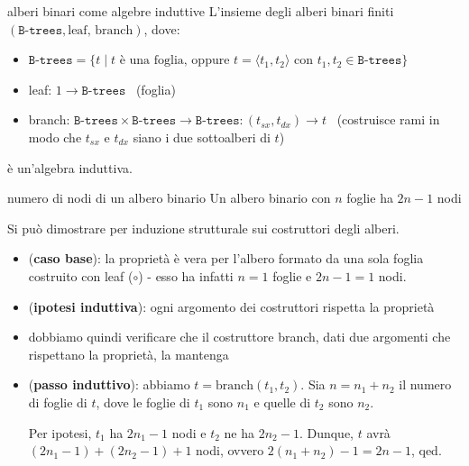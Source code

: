 \documentclass[a4paper,11pt]{report}
\begin{document}
\begin{gframe}{alberi binari come algebre induttive}
    L'insieme degli alberi binari finiti \( (\texttt{B-trees}, \text{leaf, branch}) \), dove:
    \begin{itemize}
        \item \( \texttt{B-trees}=\{t \mid t \text{ è una foglia, oppure } t=\langle t_1, t_2 \rangle \text{ con } t_1, t_2 \in \texttt{B-trees}\} \)
        \item leaf: \( 1\to \texttt{B-trees} \) \ {\color{gray}(foglia)}
        \item branch: \( \texttt{B-trees} \times  \texttt{B-trees} \to  \texttt{B-trees} : (t_{sx}, t_{dx})\to t\) \ {\color{gray}(costruisce rami in modo che \( t_{sx} \) e \( t_{dx} \) siano i due sottoalberi di \( t \))}
    \end{itemize}
    è un'algebra induttiva.
    \begin{thmframe}{numero di nodi di un albero binario}{}
        Un albero binario con \( n \) foglie ha \( 2n-1 \) nodi
        \begin{proofframe}
            Si può dimostrare per induzione strutturale sui costruttori degli alberi.
            \begin{itemize}
                \item (\textbf{caso base}): la proprietà è vera per l'albero formato da una sola foglia costruito con leaf (\( \circ \)) - esso ha infatti \( n = 1 \) foglie e \( 2n-1 = 1 \) nodi.
                \item (\textbf{ipotesi induttiva}): ogni argomento dei costruttori rispetta la proprietà
                \item dobbiamo quindi verificare che il costruttore branch, dati due argomenti che rispettano la proprietà, la mantenga
                \item (\textbf{passo induttivo}): abbiamo \( t = \text{branch}(t_1, t_2)\). 
                    \subitem Sia \(n = n_1 + n_2 \) il numero di foglie di \( t \), dove le foglie di \( t_1 \) sono \( n_1 \) e quelle di \( t_2 \) sono \( n_2 \). 

                    Per ipotesi, \( t_1 \) ha \( 2n_1 - 1 \) nodi e \( t_2 \) ne ha \( 2n_2 - 1 \). Dunque, \( t \) avrà \( (2n_1 -1) + (2n_2 -1) + 1\) nodi, ovvero \( 2(n_1 + n_2) -1 = 2n - 1 \), qed.
            \end{itemize}

        \end{proofframe}

    \end{thmframe}
\end{gframe}
\end{document}
